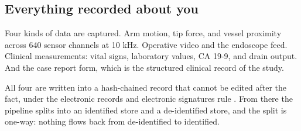 \vspace{0.30em}

\subsection{Everything recorded about you}

Four kinds of data are captured. Arm motion, tip force, and vessel proximity
across 640 sensor channels at 10 kHz. Operative video and the endoscope feed.
Clinical measurements: vital signs, laboratory values, CA 19-9, and drain
output. And the case report form, which is the structured clinical record of the
study.

All four are written into a hash-chained record that cannot be edited after the
fact, under the electronic records and electronic signatures rule
\cite{ecfr2026part11}. From there the pipeline splits into an identified store
and a de-identified store, and the split is one-way: nothing flows back from
de-identified to identified.


